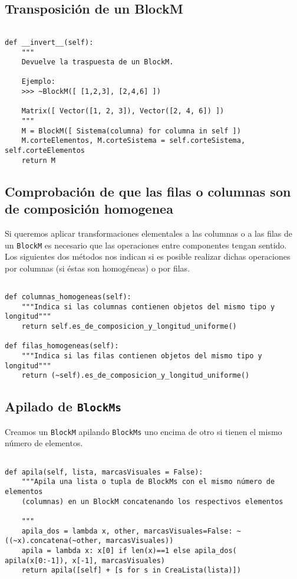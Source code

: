 \documentclass[11pt]{report}
\begin{document}
\subsection{Transposición de un BlockM}
\label{sec:orga449c8d}

\begin{verbatim}

def __invert__(self):
    """
    Devuelve la traspuesta de un BlockM.
    
    Ejemplo:
    >>> ~BlockM([ [1,2,3], [2,4,6] ])
    
    Matrix([ Vector([1, 2, 3]), Vector([2, 4, 6]) ])
    """
    M = BlockM([ Sistema(columna) for columna in self ])
    M.corteElementos, M.corteSistema = self.corteSistema, self.corteElementos
    return M

\end{verbatim}

\subsection{Comprobación de que las filas o columnas son de composición homogenea}
\label{sec:org21781bf}

Si queremos aplicar transformaciones elementales a las columnas o a
las filas de un \texttt{BlockM} es necesario que las operaciones entre
componentes tengan sentido. Los siguientes dos métodos nos indican si
es posible realizar dichas operaciones por columnas (si éstas son
homogéneas) o por filas.
\begin{verbatim}

def columnas_homogeneas(self):
    """Indica si las columnas contienen objetos del mismo tipo y longitud"""
    return self.es_de_composicion_y_longitud_uniforme()

def filas_homogeneas(self):
    """Indica si las filas contienen objetos del mismo tipo y longitud"""
    return (~self).es_de_composicion_y_longitud_uniforme()

\end{verbatim}

\subsection{Apilado de \texttt{BlockMs}}
\label{sec:org9d75c9d}

Creamos un \texttt{BlockM} apilando \texttt{BlockMs} uno encima de otro si tienen el
mismo número de elementos.
\begin{verbatim}

def apila(self, lista, marcasVisuales = False):
    """Apila una lista o tupla de BlockMs con el mismo número de elementos
    (columnas) en un BlockM concatenando los respectivos elementos

    """
    apila_dos = lambda x, other, marcasVisuales=False: ~((~x).concatena(~other, marcasVisuales))
    apila = lambda x: x[0] if len(x)==1 else apila_dos( apila(x[0:-1]), x[-1], marcasVisuales)
    return apila([self] + [s for s in CreaLista(lista)])

\end{verbatim}
\end{document}
